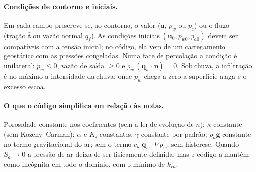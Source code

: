 \documentclass[11pt,a4paper]{article}
\newcommand{\vu}{\bm u}
\newcommand{\vq}{\bm q}
\newcommand{\vg}{\bm g}
\newcommand{\vt}{\bm t}
\begin{document}
\begin{center}
\label{fig:acoplamento}
\end{center}

\paragraph{Condições de contorno e iniciais.} Em cada campo prescreve-se, no contorno, o
valor ($\vu$, $p_w$ ou $p_a$) ou o fluxo (tração $\bar{\vt}$ ou vazão normal $\bar q_f$).
As condições iniciais $(\vu_0,p_{w0},p_{a0})$ devem ser compatíveis com a tensão
inicial; no código, ela vem de um carregamento geostático com as pressões congeladas.
Numa face de percolação a condição é unilateral: $p_w\le0$, vazão de saída $\ge0$ e
$p_w\,(\vq_w\cdot\bm n)=0$. Sob chuva, a infiltração é no máximo a intensidade da
chuva; onde $p_w$ chega a zero a superfície alaga e o excesso escoa.

\paragraph{O que o código simplifica em relação às notas.} Porosidade constante nos
coeficientes (sem a lei de evolução de $n$); $\kappa$ constante (sem Kozeny--Carman);
$\alpha$ e $K_s$ constantes; $\gamma$ constante por padrão; $\rho_a\vg$ constante no
termo gravitacional do ar; sem o termo $c_w\,\vq_w\cdot\nabla p_w$; sem histerese. Quando
$S_a\to0$ a pressão do ar deixa de ser fisicamente definida, mas o código a mantém como
incógnita em todo o domínio, com o mínimo de $k_{ra}$.
\end{document}
